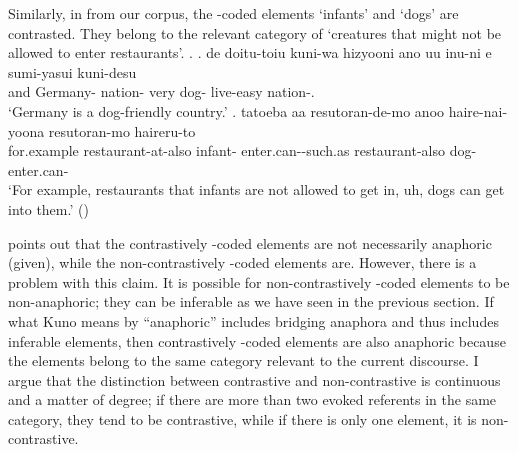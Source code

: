 Similarly, in \Next from our corpus,
the -coded elements  `infants' and  `dogs' are contrasted.
They belong to the relevant category of `creatures that might not be allowed to enter restaurants'.
%
\ex.
 \ag. de doitu-toiu kuni-wa hizyooni ano uu inu-ni e sumi-yasui kuni-desu \\
 	and Germany- nation- very   dog-  live-easy nation-. \\
	`Germany is a dog-friendly country.'
 \bg. tatoeba aa resutoran-de-mo anoo  haire-nai-yoona resutoran-mo  haireru-to \\
 	for.example  restaurant-at-also  infant- enter.can--such.as restaurant-also dog- enter.can- \\
 	`For example, restaurants that infants are not allowed to get in, uh, dogs can get into them.'
	\hfill{()}


 points out that
the contrastively -coded elements are not necessarily anaphoric (given),
while the non-contrastively -coded elements are.
However, there is a problem with this claim.
It is possible for non-contrastively -coded elements to be non-anaphoric;
they can be inferable as we have seen in the previous section.
If what Kuno means by ``anaphoric'' includes bridging anaphora \cite{clark75} and thus includes inferable elements,
then contrastively -coded elements are also anaphoric
because the elements belong to the same category relevant to the current discourse.
I argue that the distinction between contrastive and non-contrastive is continuous and a matter of degree;
if there are more than two evoked referents in the same category,
they tend to be contrastive,
while if there is only one element,
it is non-contrastive.
%
%




